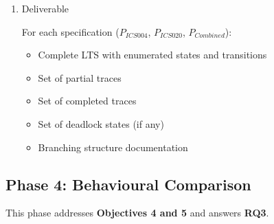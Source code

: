 \begin{enumerate}
  Produce transition graphs for each LTS. Example structure for
  \(LTS_{Data}\):

  \begin{verbatim}
  State S0 (Initial) --chan_open_init_A--> S1
  State S1 --chan_open_try_B--> S2
  State S2 --chan_open_ack_A--> S3
  State S3 --chan_open_confirm_B--> S4 (Channel Open)
  State S4 --send_packet_A--> S5
  State S5 --recv_packet_B--> S6
  State S6 (Choice) --ack_B--> S7 or --timeout_A--> S8
  ...
  \end{verbatim}
\item
  Deliverable

  For each specification (\(P_{ICS004}\), \(P_{ICS020}\),
  \(P_{Combined}\)):

  \begin{itemize}
      \item Complete LTS with enumerated states and transitions
      \item Set of partial traces
      \item Set of completed traces
      \item Set of deadlock states (if any)
      \item Branching structure documentation
  \end{itemize}
\end{enumerate}

\subsection{Phase 4: Behavioural
Comparison}\label{phase-4-behavioural-comparison}

This phase addresses \textbf{Objectives 4 and 5} and answers
\textbf{RQ3}.

